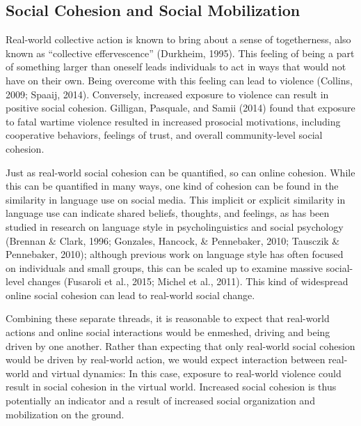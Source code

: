 \documentclass[english,man]{apa6}
\begin{document}
\hypertarget{social-cohesion-and-social-mobilization}{%
\subsection{Social Cohesion and Social Mobilization}\label{social-cohesion-and-social-mobilization}}

Real-world collective action is known to bring about a sense of togetherness,
also known as \enquote{collective effervescence} (Durkheim, 1995). This
feeling of being a part of something larger than oneself leads individuals
to act in ways that would not have on their own. Being overcome with this
feeling can lead to violence (Collins, 2009; Spaaij, 2014).
Conversely, increased exposure
to violence can result in positive social cohesion. Gilligan, Pasquale, and Samii (2014)
found that exposure to fatal wartime violence resulted in increased prosocial
motivations, including cooperative behaviors, feelings of trust, and overall
community-level social cohesion.

Just as real-world social cohesion can be
quantified, so can online cohesion. While this can be quantified in many ways,
one kind of cohesion can be found in the similarity in language use on social media.
This implicit or explicit similarity in language use can indicate shared
beliefs, thoughts, and feelings, as has been studied in research on language style
in psycholinguistics and social psychology
(Brennan \& Clark, 1996; Gonzales, Hancock, \& Pennebaker, 2010; Tausczik \& Pennebaker, 2010);
although previous work on language style
has often focused on individuals and small groups, this can be scaled up to examine
massive social-level changes (Fusaroli et al., 2015; Michel et al., 2011).
This kind of widespread online social cohesion can lead to real-world
social change.

Combining these separate threads, it is reasonable to expect that real-world actions
and online social interactions would be enmeshed, driving and being driven by
one another. Rather than expecting that only real-world social cohesion would be
driven by real-world action, we would expect interaction between real-world and
virtual dynamics: In this case, exposure to real-world violence could result in social
cohesion in the virtual world. Increased social cohesion is thus potentially
an indicator and a result of increased social organization and mobilization
on the ground.
\end{document}
